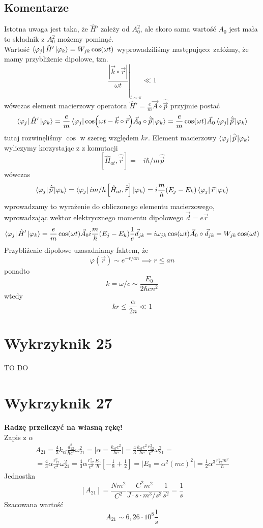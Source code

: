 \documentclass[a4paper,12pt]{article}
\begin{document}
\subsection{Komentarze}
	Istotna uwaga jest taka, że $\hat{H}'$ zależy od $A_0^2$, ale skoro sama wartość $A_0$ jest mała to składnik z $A_0^2$ możemy pominąć.\\
	Wartość $\bra{\varphi_j}\hat{H}'\ket{\varphi_k} = W_{jk}\cos(\omega t)$ wyprowadziliśmy następująco: załóżmy, że mamy przybliżenie dipolowe, tzn. 
		$$
		\left.\frac{|\vec{k}\circ\vec{r}|}{\omega t}\right|_{t\sim\pi} \ll 1
		$$
	wówczas element macierzowy operatora $\hat{H}' = \frac{e}{m}\vec{A}\circ\hat{\vec{p}}$ przyjmie postać
		$$
		\bra{\varphi_j}\hat{H}'\ket{\varphi_k}=\frac{e}{m}\bra{\varphi_j}\cos(\omega t-\vec{k}\circ\vec{r})\vec{A}_0\circ\hat{\vec{p}}\ket{\varphi_k} = \frac{e}{m}\cos(\omega t)\vec{A}_0
		\bra{\varphi_j}\hat{\vec{p}}\ket{\varphi_k}
		$$
	tutaj rozwinęliśmy $\cos$ w szereg względem $kr$. Element macierzowy $\bra{\varphi_j}\hat{\vec{p}}\ket{\varphi_k}$ wyliczymy korzystając z z komutacji
		$$
		\left[\hat{H}_{at},\hat{\vec{r}}\right] = -i\hbar/m \hat{\vec{p}}
		$$
	wówczas
		$$
		\bra{\varphi_j}\hat{\vec{p}}\ket{\varphi_k} = \bra{\varphi_j}im/\hbar\left[\hat{H}_{at},\hat{\vec{r}}\right]\ket{\varphi_k}= i\frac{m}{\hbar}(E_j-E_k)\bra{\varphi_j}\vec{r}\ket{\varphi_k}
		$$
	wprowadzamy to wyrażenie do obliczonego elementu macierzowego, wprowadzając wektor elektrycznego momentu dipolowego $\vec{d}=e\vec{r}$
		$$
			\bra{\varphi_j}\hat{H}'\ket{\varphi_k} = \frac{e}{m}\cos(\omega t)\vec{A}_0i\frac{m}{\hbar}(E_j-E_k)\frac{1}{e}\vec{d}_{jk} = i\omega_{jk}\cos(\omega t)\vec{A}_0\circ\vec{d}_{jk} = W_{jk}\cos(\omega t)
		$$
	Przybliżenie dipolowe uzasadniamy faktem, że 
		$$
		\varphi(\vec{r}) \sim e^{-r/a n} \implies r \leq a n
		$$
	ponadto 
		$$
		k = \omega/c \sim \frac{E_0}{2\hbar c n^2}
		$$
	wtedy
		$$
		kr \leq \frac{\alpha}{2n} \ll 1
		$$
\section{Wykrzyknik 25}
TO DO
\section{Wykrzyknik 27}
\textbf{Radzę przeliczyć na własną rękę!}\\
	Zapis z $\alpha$
	$$
	\begin{gathered}
		A_{21} = \frac{4}{3}k_{el}\frac{d_{12}^2}{\hbar c^3}\omega_{21}^2 = \bigg\vert \alpha = \frac{k_{el} e^2}{\hbar c} \bigg\vert = \frac{4}{3} \frac{k_{el} e^2}{\hbar c}
				\frac{r_{12}^2}{c^2}\omega_{21}^2 =\\
				=\frac{4}{3} \alpha \frac{r_{12}^2}{c^2}\omega_{21}^2 = \frac{4}{3} \alpha \frac{r_{12}^2}{c^2} \frac{E_0}{\hbar}\left[-\frac{1}{8}+\frac{1}{2}\right] = 
				\bigg\vert E_0 = \alpha^2 (mc)^2\bigg\vert = \frac{1}{2}\alpha^3 \frac{r_{12}^2m^2}{\hbar}
	\end{gathered}
	$$
	Jednostka
	$$
	[A_{21}] = \frac{Nm^2}{C^2}\frac{C^2 m^2}{J\cdot s\cdot m^3/s^3}\frac{1}{s^2} = \frac{1}{s}
	$$
	Szacowana wartość
	$$
	A_{21} \sim 6,26 \cdot10^{8} \frac{1}{s}
	$$
\end{document}
